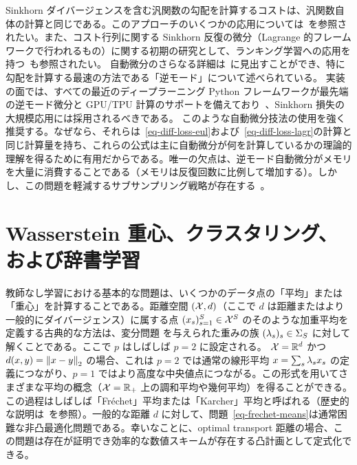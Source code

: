 Sinkhorn ダイバージェンスを含む汎関数の勾配を計算するコストは、汎関数自体の計算と同じである。このアプローチのいくつかの応用については~\citep{2016-bonneel-barycoord,2017-Genevay-AutoDiff}を参照されたい。また、コスト行列に関する Sinkhorn 反復の微分（Lagrange 的フレームワークで行われるもの）に関する初期の研究として、ランキング学習への応用を持つ~\citep{adams2011ranking}も参照されたい。
自動微分のさらなる詳細は~\citep{griewank2008evaluating,rall1981automatic,Neidinger10}に見出すことができ、特に勾配を計算する最速の方法である「逆モード」について述べられている。
実装の面では、すべての最近のディープラーニング Python フレームワークが最先端の逆モード微分と GPU/TPU 計算のサポートを備えており~\citep{theano2016,abadi2016tensorflow,pytorch}、Sinkhorn 損失の大規模応用には採用されるべきである。
このような自動微分技法の使用を強く推奨する。なぜなら、それらは~\eqref{eq-diff-loss-eul}および~\eqref{eq-diff-loss-lagr}の計算と同じ計算量を持ち、これらの公式は主に自動微分が何を計算しているかの理論的理解を得るために有用だからである。唯一の欠点は、逆モード自動微分がメモリを大量に消費することである（メモリは反復回数に比例して増加する）。しかし、この問題を軽減するサブサンプリング戦略が存在する~\citep{griewank1992achieving}。



\section{Wasserstein 重心、クラスタリング、および辞書学習}
\label{sec-bary}

教師なし学習における基本的な問題は、いくつかのデータ点の「平均」または「重心」を計算することである。距離空間 $(\mathcal{X},d)$（ここで $d$ は距離またはより一般的にダイバージェンス）に属する点 $(x_s)_{s=1}^S \in \mathcal{X}^S$ のそのような加重平均を定義する古典的な方法は、変分問題
を与えられた重みの族 $(\lambda_s)_s \in \Sigma_S$ に対して解くことである。ここで $p$ はしばしば $p=2$ に設定される。
$\mathcal{X}=\mathbb{R}^d$ かつ $d(x,y)=\left\| x-y \right\|_2$ の場合、これは $p=2$ では通常の線形平均 $x=\sum_s \lambda_s x_s$ の定義につながり、$p=1$ ではより高度な中央値点につながる。この形式を用いてさまざまな平均の概念（\eg $\mathcal{X}=\mathbb{R}_+$ 上の調和平均や幾何平均）を得ることができる。
この過程はしばしば「Fr\'echet」平均または「Karcher」平均と呼ばれる（歴史的な説明は~\citet{karcher2014riemannian}を参照）。一般的な距離 $d$ に対して、問題~\eqref{eq-frechet-means}は通常困難な非凸最適化問題である。幸いなことに、optimal transport 距離の場合、この問題は存在が証明でき効率的な数値スキームが存在する凸計画として定式化できる。


